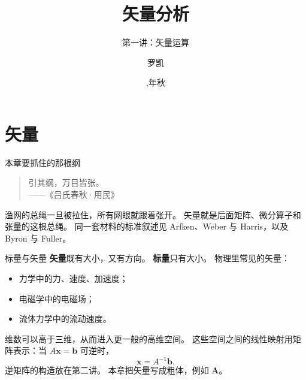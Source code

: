 \documentclass[fontset=windows, chinese, 10pt, xcolor=dvipsnames]{beamer}
\title{矢量分析}
\subtitle{第一讲：矢量运算}
\date{\zhdigits{\the\year},\zhganzhinian{\the\year}年秋}
\author{罗凯}
\institute{南京理工大学物理学院}
\begin{document}
\begin{frame}
  \titlepage
\end{frame}


\begin{frame}
  \titlepage
\end{frame}


\section{矢量}

\begin{frame}{本章要抓住的那根纲}
  \begin{quote}
    引其纲，万目皆张。\\
    \hfill ——《吕氏春秋·用民》
  \end{quote}
  渔网的总绳一旦被拉住，所有网眼就跟着张开。
  矢量就是后面矩阵、微分算子和张量的这根总绳。
  \vspace{0.4em}
  同一套材料的标准叙述见 Arfken、Weber 与 Harris，以及 Byron 与 Fuller。
\end{frame}

\begin{frame}{标量与矢量}
  \textbf{矢量}既有大小，又有方向。
  \textbf{标量}只有大小。
  \vspace{0.5em}
  物理里常见的矢量：
  \begin{itemize}
    \item 力学中的力、速度、加速度；
    \item 电磁学中的电磁场；
    \item 流体力学中的流动速度。
  \end{itemize}
  维数可以高于三维，从而进入更一般的高维空间。
  这些空间之间的线性映射用矩阵表示：当 $A\mathbf{x}=\mathbf{b}$ 可逆时，
  \begin{equation*}
    \mathbf{x}=A^{-1}\mathbf{b}.
  \end{equation*}
  逆矩阵的构造放在第二讲。
  \vspace{0.3em}
  本章把矢量写成粗体，例如 $\mathbf{A}$。
\end{frame}
\end{document}
